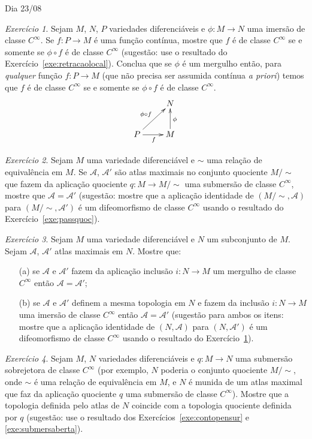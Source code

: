 \documentclass[oneside,11pt]{amsart}
\theoremstyle{remark}\newtheorem{exercise}{Exercício}[section]
\theoremstyle{plain}\newtheorem{teo}{Teorema}[section]
\theoremstyle{plain}\newtheorem{lem}[teo]{Lema}
\theoremstyle{plain}\newtheorem{prop}[teo]{Proposição}
\theoremstyle{definition}\newtheorem{defin}[teo]{Definição}
\theoremstyle{remark}\newtheorem{rem}[teo]{Observação}
\theoremstyle{definition}\newtheorem{example}[teo]{Exemplo}
\numberwithin{equation}{section}
\begin{document}
\begin{section}{Dia 23/08}
\begin{exercise}\label{exe:lowercounterdomain}
Sejam $M$, $N$, $P$ variedades diferenciáveis e $\phi:M\to N$ uma imersão de classe $C^\infty$. Se $f:P\to M$ é uma função contínua, mostre que
$f$ é de classe $C^\infty$ se e somente se $\phi\circ f$ é de classe $C^\infty$ (sugestão: use o resultado do Exercício~\ref{exe:retracaolocal}).
Conclua que se $\phi$ é um mergulho então, para {\em qualquer\/} função $f:P\to M$ (que não precisa ser assumida contínua {\it a priori}) temos
que $f$ é de classe $C^\infty$ se e somente se $\phi\circ f$ é de classe $C^\infty$.
\[\xymatrix{%
&N\\
P\ar[ur]^{\phi\circ f}\ar[r]_f&M\ar[u]_\phi}\]
\end{exercise}

\begin{exercise}
Sejam $M$ uma variedade diferenciável e $\sim$ uma relação de equivalência em $M$. Se $\mathcal A$, $\mathcal A'$ são atlas maximais no conjunto quociente
$M/{\sim}$ que fazem da aplicação quociente $q:M\to M/{\sim}$ uma submersão de classe $C^\infty$, mostre que $\mathcal A=\mathcal A'$ (sugestão:
mostre que a aplicação identidade de $(M/{\sim},\mathcal A)$ para $(M/{\sim},\mathcal A')$ é um difeomorfismo de classe $C^\infty$ usando o resultado
do Exercício~\ref{exe:passquoc}).
\end{exercise}

\begin{exercise}\label{exe:uniqembed}
Sejam $M$ uma variedade diferenciável e $N$ um subconjunto de $M$. Sejam $\mathcal A$, $\mathcal A'$ atlas maximais em $N$. Mostre que:
\begin{itemize}
\item[(a)] se $\mathcal A$ e $\mathcal A'$ fazem da aplicação inclusão $i:N\to M$ um mergulho de classe $C^\infty$ então $\mathcal A=\mathcal A'$;
\item[(b)] se $\mathcal A$ e $\mathcal A'$ definem a mesma topologia em $N$ e fazem da inclusão $i:N\to M$ uma imersão de classe $C^\infty$ então
$\mathcal A=\mathcal A'$ (sugestão para ambos os itens: mostre que a aplicação identidade de $(N,\mathcal A)$ para $(N,\mathcal A')$ é um difeomorfismo
de classe $C^\infty$ usando o resultado do Exercício~\ref{exe:lowercounterdomain}).
\end{itemize}
\end{exercise}

\begin{exercise}
Sejam $M$, $N$ variedades diferenciáveis e $q:M\to N$ uma submersão sobrejetora de classe $C^\infty$ (por exemplo, $N$ poderia o conjunto
quociente $M/{\sim}$, onde $\sim$ é uma relação de equivalência em $M$, e $N$ é munida de um atlas maximal que faz da aplicação quociente $q$ uma submersão de classe
$C^\infty$). Mostre que a topologia definida pelo atlas de $N$ coincide com a topologia quociente definida por $q$ (sugestão: use o resultado dos
Exercícios~\ref{exe:contopensur} e \ref{exe:submersaberta}).
\end{exercise}


\end{section}
\end{document}
